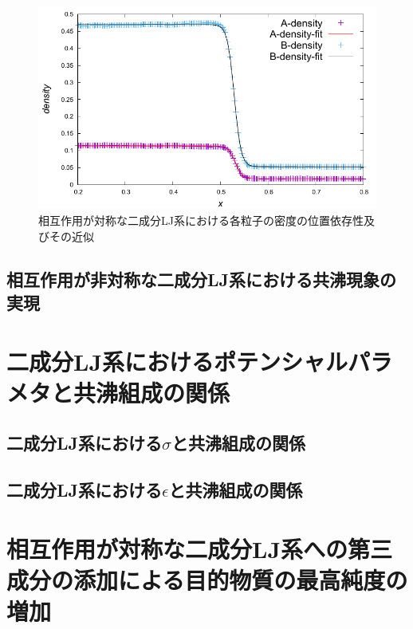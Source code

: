 \documentclass[titlepage]{jsreport}
\begin{document}
\begin{figure}[htbp]
    \begin{center}
        \includegraphics[width=14cm]{fig/lan140493-lbn561971-ran3930-rbn15722/lan140493-lbn561971-ran3930-rbn15722-fitting.pdf}
    \end{center}
    \caption{相互作用が対称な二成分LJ系における各粒子の密度の位置依存性及びその近似}
    \label{fig:lan140493-lbn561971-ran3930-rbn15722-fitting}
\end{figure}


\subsection{相互作用が非対称な二成分LJ系における共沸現象の実現} \label{results-subsec:bi-asymmetric-component-azeotrope}


\section{二成分LJ系におけるポテンシャルパラメタと共沸組成の関係} \label{results-sec:bi-component-potential-parameter-azeotrope-ratio}
\subsection{二成分LJ系における$\sigma$と共沸組成の関係} \label{results-subsec:bi-component-sigma-azeotrope-ratio}
\subsection{二成分LJ系における$\epsilon$と共沸組成の関係} \label{results-subsec:bi-component-epsilon-azeotrope-ratio}


\section{相互作用が対称な二成分LJ系への第三成分の添加による目的物質の最高純度の増加} \label{results-sec:bi-component-addition-of-3rd-component-highest-purity}
\end{document}
